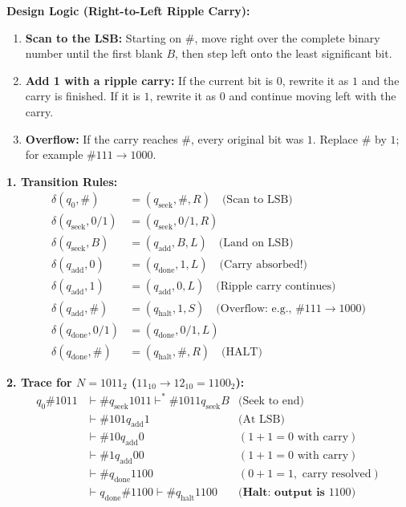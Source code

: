 \documentclass[11pt,a4paper]{article}
\begin{document}
\begin{solutionbox}
\textbf{Design Logic (Right-to-Left Ripple Carry):}
\begin{enumerate}[leftmargin=*]
    \item \textbf{Scan to the LSB:} Starting on $\#$, move right over the complete binary number until the first blank $B$, then step left onto the least significant bit.
    \item \textbf{Add 1 with a ripple carry:} If the current bit is $0$, rewrite it as $1$ and the carry is finished. If it is $1$, rewrite it as $0$ and continue moving left with the carry.
    \item \textbf{Overflow:} If the carry reaches $\#$, every original bit was $1$. Replace $\#$ by $1$; for example $\#111\rightarrow1000$.
\end{enumerate}

\textbf{1. Transition Rules:}
\begin{align*}
\delta(q_0, \#) &= (q_{\text{seek}}, \#, R) \quad \text{(Scan to LSB)} \\
\delta(q_{\text{seek}}, 0/1) &= (q_{\text{seek}}, 0/1, R) \\
\delta(q_{\text{seek}}, B) &= (q_{\text{add}}, B, L) \quad \text{(Land on LSB)} \\
\delta(q_{\text{add}}, 0) &= (q_{\text{done}}, 1, L) \quad \text{(Carry absorbed!)} \\
\delta(q_{\text{add}}, 1) &= (q_{\text{add}}, 0, L) \quad \text{(Ripple carry continues)} \\
\delta(q_{\text{add}}, \#) &= (q_{\text{halt}}, 1, S) \quad \text{(Overflow: e.g., } \#111 \rightarrow 1000\text{)} \\
\delta(q_{\text{done}}, 0/1) &= (q_{\text{done}}, 0/1, L) \\
\delta(q_{\text{done}}, \#) &= (q_{\text{halt}}, \#, R) \quad \text{(HALT)}
\end{align*}

\textbf{2. Trace for $N=1011_2$ ($11_{10}\rightarrow12_{10}=1100_2$):}
$$
\begin{array}{rll}
q_0\#1011 & \vdash \#q_{\text{seek}}1011 \vdash^* \#1011q_{\text{seek}}B & \text{(Seek to end)}\\
& \vdash \#101q_{\text{add}}1 & \text{(At LSB)}\\
& \vdash \#10q_{\text{add}}0 & (1+1=0\text{ with carry})\\
& \vdash \#1q_{\text{add}}00 & (1+1=0\text{ with carry})\\
& \vdash \#q_{\text{done}}1100 & (0+1=1,\text{ carry resolved})\\
& \vdash q_{\text{done}}\#1100 \vdash \#q_{\text{halt}}1100 & \textbf{(Halt: output is }1100\textbf{)}
\end{array}
$$
\end{solutionbox}
\end{document}
